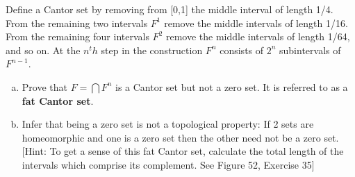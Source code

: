 \documentclass[a4paper, 12pt]{article}
\begin{document}
\begin{problem} [3.31]
Define a Cantor set by removing from [0,1] the middle interval of length 1/4. From the remaining two intervals $F^1$ remove the middle intervals of length 1/16. From the remaining four intervals $F^2$ remove the middle intervals of length 1/64, and so on. At the $n^th$ step in the construction $F^n$ consists of $2^n$ subintervals of $F^{n-1}$.
\begin{enumerate} [(a)]
    \item Prove that $F = \bigcap F^n$ is a Cantor set but not a zero set. It is referred to as a \textbf{fat Cantor set}.
    \item Infer that being a zero set is not a topological property: If 2 sets are homeomorphic and one is a zero set then the other need not be a zero set. [Hint: To get a sense of this fat Cantor set, calculate the total length of the intervals which comprise its complement. See Figure 52, Exercise 35]
\end{enumerate}
\end{problem}
\end{document}
